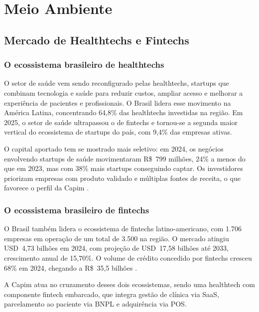 
\chapter{Meio Ambiente}
\label{cap:meio-ambiente}

\section{Mercado de Healthtechs e Fintechs}

\subsection{O ecossistema brasileiro de healthtechs}

O setor de saúde vem sendo reconfigurado pelas healthtechs, startups que combinam tecnologia e saúde para reduzir custos, ampliar acesso e melhorar a experiência de pacientes e profissionais. O Brasil lidera esse movimento na América Latina, concentrando 64,8\% das healthtechs investidas na região. Em 2025, o setor de saúde ultrapassou o de fintechs e tornou-se a segunda maior vertical do ecossistema de startups do país, com 9,4\% das empresas ativas.

O capital aportado tem se mostrado mais seletivo: em 2024, os negócios envolvendo startups de saúde movimentaram R\$~799 milhões, 24\% a menos do que em 2023, mas com 38\% mais startups conseguindo captar. Os investidores priorizam empresas com produto validado e múltiplas fontes de receita, o que favorece o perfil da Capim \cite{distrito2024healthtech, abstartups2025}.

\subsection{O ecossistema brasileiro de fintechs}

O Brasil também lidera o ecossistema de fintechs latino-americano, com 1.706 empresas em operação de um total de 3.500 na região. O mercado atingiu USD~4,73 bilhões em 2024, com projeção de USD~17,58 bilhões até 2033, crescimento anual de 15,70\%. O volume de crédito concedido por fintechs cresceu 68\% em 2024, chegando a R\$~35,5 bilhões \cite{distrito2025fintech, imarc2024, abcdpwc2024}.

A Capim atua no cruzamento desses dois ecossistemas, sendo uma healthtech com componente fintech embarcado, que integra gestão de clínica via SaaS, parcelamento ao paciente via BNPL e adquirência via POS.

